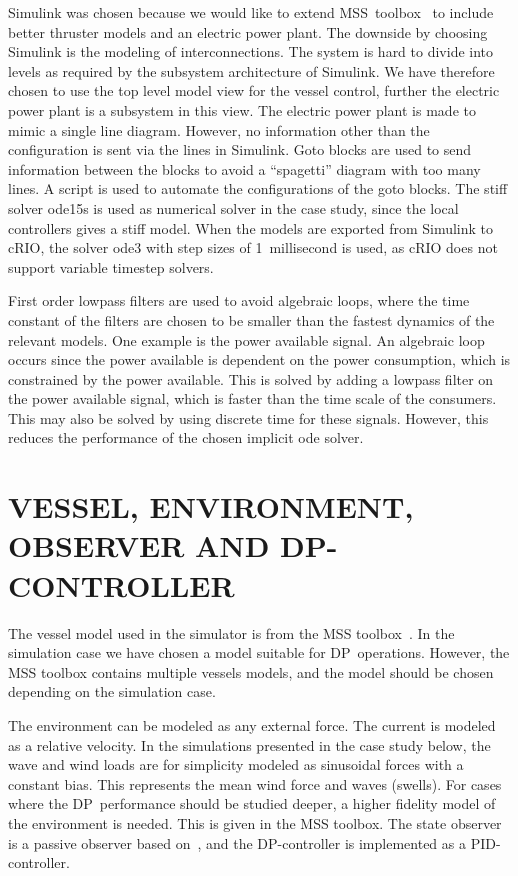 \documentclass[twocolumn,10pt]{asme2e}
\begin{document}
Simulink was chosen because we would like to extend MSS~toolbox~\cite{MSS} to include better thruster models and an electric power plant.
The downside by choosing Simulink is the modeling of interconnections.
The system is hard to divide into levels as required by the subsystem architecture of Simulink.
We have therefore chosen to use the top level model view for the vessel control, further the electric power plant is a subsystem in this view.
The electric power plant is made to mimic a single line diagram.
However, no information other than the configuration is sent via the lines in Simulink.
Goto blocks are used to send information between the blocks to avoid a ``spagetti'' diagram with too many lines.
A script is used to automate the configurations of the goto blocks.
The stiff solver ode15s is used as numerical solver in the case study, since the local controllers gives a stiff model.
When the models are exported from Simulink to cRIO, the solver ode3 with step sizes of 1~millisecond is used, as cRIO does not support variable timestep solvers.

First order lowpass filters are used to avoid algebraic loops, where the time constant of the filters are chosen to be smaller than the fastest dynamics of the relevant models.
One example is the power available signal.
An algebraic loop occurs since the power available is dependent on the power consumption, which is constrained by the power available.
This is solved by adding a lowpass filter on the power available signal, which is faster than the time scale of the consumers.
This may also be solved by using discrete time for these signals.
However, this reduces the performance of the chosen implicit ode solver.

\section*{\uppercase{Vessel, Environment, Observer and DP-controller}}
The vessel model used in the simulator is from the MSS toolbox~\cite{MSS}.
In the simulation case we have chosen a model suitable for DP~operations.
However, the MSS toolbox contains multiple vessels models, and the model should be chosen depending on the simulation case.

The environment can be modeled as any external force.
The current is modeled as a relative velocity.
In the simulations presented in the case study below, the wave and wind loads are for simplicity modeled as sinusoidal forces with a constant bias.
This represents the mean wind force and waves (swells).
For cases where the DP~performance should be studied deeper, a higher fidelity model of the environment is needed.
This is given in the MSS toolbox.
The state observer is a passive observer based on~\cite{Fossen19993}, and the DP-controller is implemented as a PID-controller.
\end{document}

